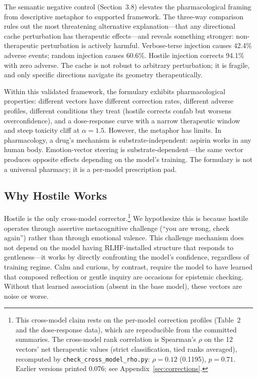 \documentclass[11pt,a4paper]{article}
\begin{document}
The semantic negative control (Section~3.8) elevates the pharmacological
framing from descriptive metaphor to supported framework. The three-way
comparison rules out the most threatening alternative explanation---that
any directional cache perturbation has therapeutic effects---and reveals
something stronger: non-therapeutic perturbation is actively harmful.
Verbose-terse injection causes 42.4\% adverse events; random injection
causes 60.6\%. Hostile injection corrects 94.1\% with zero adverse.
The cache is not robust to arbitrary perturbation; it is fragile, and
only specific directions navigate its geometry therapeutically.

Within this validated framework, the formulary exhibits pharmacological
properties: different vectors have different correction rates, different
adverse profiles, different conditions they treat (hostile corrects
confab but worsens overconfidence), and a dose-response curve with a
narrow therapeutic window and steep toxicity cliff at $\alpha = 1.5$.
However, the metaphor has limits. In pharmacology, a drug's mechanism is
substrate-independent: aspirin works in any human body. Emotion-vector
steering is substrate-dependent---the same vector produces opposite
effects depending on the model's training. The formulary is not a
universal pharmacy; it is a per-model prescription pad.

\subsection{Why Hostile Works}

Hostile is the only cross-model corrector.\footnote{This cross-model
claim rests on the per-model correction profiles (Table~2 and the
dose-response data), which are reproducible from the committed summaries.
The cross-model rank correlation is Spearman's $\rho$ on the 12
vectors' net therapeutic values (strict classification, tied ranks
averaged), recomputed by \texttt{check\_cross\_model\_rho.py}: $\rho = 0.12$
(0.1195), $p = 0.71$. Earlier versions printed 0.076; see
Appendix~\ref{sec:corrections}.} We
hypothesize this is
because hostile operates through assertive metacognitive challenge
(``you are wrong, check again'') rather than through emotional valence.
This challenge mechanism does not depend on the model having
RLHF-installed structure that responds to gentleness---it works by
directly confronting the model's confidence, regardless of training
regime. Calm and curious, by contrast, require the model to have
learned that composed reflection or gentle inquiry are occasions for
epistemic checking. Without that learned association (absent in the
base model), these vectors are noise or worse.
\end{document}
